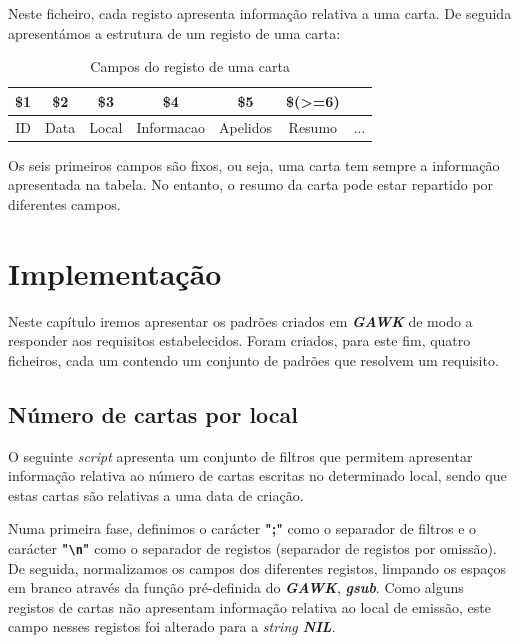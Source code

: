 \documentclass[11pt,a4paper]{report}
\newcommand*{\escape}[1]{\texttt{\textbackslash#1}}
\begin{document}
    \qquad Neste ficheiro, cada registo apresenta informação relativa a uma carta. De seguida apresentámos a estrutura de um registo de uma carta:
\\

\begin{table}[h]\centering
    \begin{tabular}{|c|c|c|c|c|c|c|}
    \hline
    \textbf{\$1} & \textbf{\$2} & \textbf{\$3} & \textbf{\$4} & \textbf{\$5} & \textbf{\$(\textgreater{}=6)} & \textbf{} \\ \hline
    ID           & Data         & Local        & Informacao   & Apelidos     & Resumo                     & ...       \\ \hline
    \end{tabular}
    \caption{Campos do registo de uma carta}
\end{table}

\quad Os seis primeiros campos são fixos, ou seja, uma carta tem sempre a informação apresentada na tabela. No entanto, o resumo da carta pode estar repartido por diferentes campos. 

\chapter{Implementação}
\qquad Neste capítulo iremos apresentar os padrões criados em \textbf{\textit{GAWK}} de modo a responder aos requisitos estabelecidos. Foram criados, para este fim, quatro ficheiros, cada um contendo um conjunto de padrões que resolvem um requisito.

\section{Número de cartas por local}

\qquad O seguinte \textit{script} apresenta um conjunto de filtros que permitem apresentar informação relativa ao número de cartas escritas no determinado local, sendo que estas cartas são relativas a uma data de criação.

\quad Numa primeira fase, definimos o carácter \textbf{";"} como o separador de filtros e o carácter \textbf{"\escape{n}"} como o separador de registos (separador de registos por omissão). De seguida, normalizamos os campos dos diferentes registos, limpando os espaços em branco através da função pré-definida do \textbf{\textit{GAWK}}, \textbf{\textit{gsub}}. Como alguns registos de cartas não apresentam informação relativa ao local de emissão, este campo nesses registos foi alterado para a \textit{string \textbf{NIL}}. 
\end{document}

